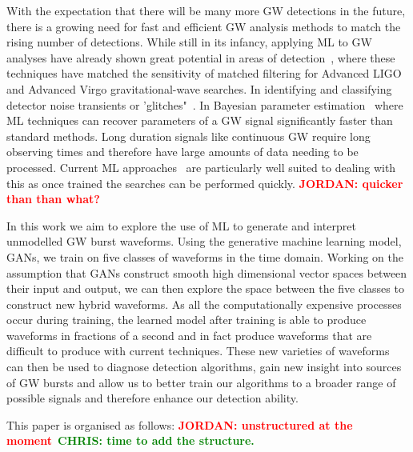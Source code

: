 \documentclass[12pt]{iopart}
\newcommand{\jordan}[1]{\textbf{\textcolor{red}{JORDAN: #1}}}
\newcommand{\chris}[1]{\textbf{\textcolor{green}{CHRIS: #1}}}
\begin{document}
%
With the expectation that there will be many more \ac{GW} detections in the
future, there is a growing need for fast and efficient \ac{GW} analysis methods
to match the rising number of detections. While still in its infancy, applying \ac{ML} to \ac{GW} analyses have already shown great potential in
areas of detection~\cite{Gabbard2017,Gebhard_2019,Krastev_2020}, where these techniques have matched the sensitivity of matched filtering for Advanced LIGO and Advanced Virgo gravitational-wave searches. In identifying and classifying detector noise transients or  'glitches"~\cite{Bahaadini, George_2018,Razzano_2018, 2020arXiv200801262G}. In Bayesian parameter
estimation~\cite{gabbard2019bayesian,
green2020gravitationalwave} where \ac{ML} techniques can recover parameters of a \ac{GW} signal significantly faster than standard methods. Long duration signals like continuous \ac{GW} require long observing times and therefore have large amounts of data needing to be processed. Current \ac{ML} approaches~\cite{2020PhRvD.102b2005D, 2019PhRvD.100d4009D, 2020arXiv200708207B} are particularly well suited to dealing with this as once trained the searches can be performed quickly. \jordan{quicker than than what?}

%
In this work we aim to explore the use of \ac{ML} to generate and interpret
unmodelled \ac{GW} burst waveforms. Using the generative machine learning
model, \acp{GAN}, we train on five classes of waveforms in the time domain. Working on the assumption that \acp{GAN} construct smooth
 high dimensional vector spaces between their input and output, we can then
explore the space between the five classes to construct new
hybrid waveforms. As all the computationally expensive
processes occur during training, the learned model after training is able to
produce waveforms in fractions of a second and in fact produce waveforms that
are difficult to produce with current
techniques. These new varieties of waveforms can then be used to diagnose
detection algorithms, gain new insight into sources of \ac{GW}
bursts and  allow us to better train our algorithms to a
broader range of possible signals and therefore enhance our detection ability. 

%
This paper is organised as follows: \jordan{unstructured at the
moment}~\chris{time to add the structure.}

\end{document}
